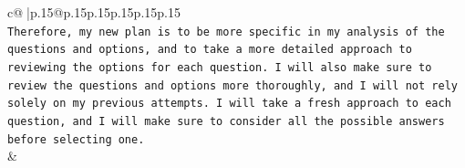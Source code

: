 \documentclass{article}
\begin{document}
{\begin{supertabular}{c@{$\;$}|p{.15\linewidth}@{}p{.15\linewidth}p{.15\linewidth}p{.15\linewidth}p{.15\linewidth}p{.15\linewidth}}
{{{\\ 
\texttt{Therefore, my new plan is to be more specific in my analysis of the questions and options, and to take a more detailed approach to reviewing the options for each question. I will also make sure to review the questions and options more thoroughly, and I will not rely solely on my previous attempts. I will take a fresh approach to each question, and I will make sure to consider all the possible answers before selecting one.} \\
            }
        }
    }
    & \\ \\

\end{supertabular}
}
\end{document}
